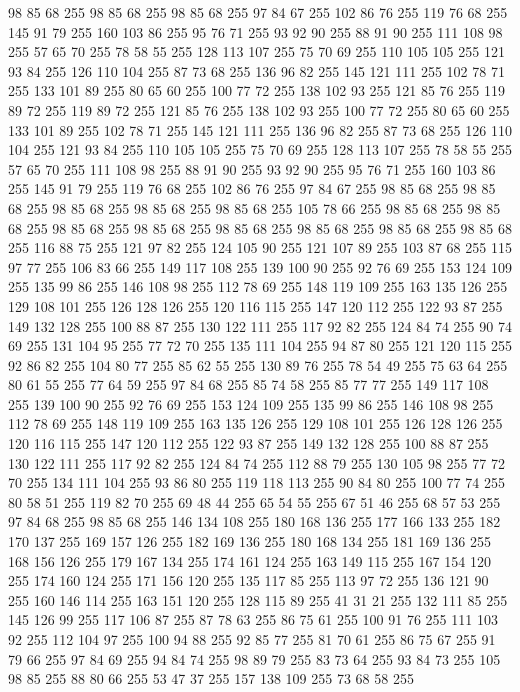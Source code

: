 98 85 68 255 98 85 68 255 98 85 68 255 97 84 67 255 102 86 76 255 119 76 68 255 145 91 79 255 160 103 86 255 95 76 71 255 93 92 90 255 88 91 90 255 111 108 98 255 57 65 70 255 78 58 55 255 128 113 107 255 75 70 69 255 110 105 105 255 121 93 84 255 126 110 104 255 87 73 68 255 136 96 82 255 145 121 111 255 102 78 71 255 133 101 89 255 80 65 60 255 100 77 72 255 138 102 93 255 121 85 76 255 119 89 72 255 119 89 72 255 121 85 76 255 138 102 93 255 100 77 72 255 80 65 60 255 133 101 89 255 102 78 71 255 145 121 111 255 136 96 82 255 87 73 68 255 126 110 104 255 121 93 84 255 110 105 105 255 75 70 69 255 128 113 107 255 78 58 55 255 57 65 70 255 111 108 98 255 88 91 90 255 93 92 90 255 95 76 71 255 160 103 86 255 145 91 79 255 119 76 68 255 102 86 76 255 97 84 67 255 98 85 68 255 98 85 68 255 98 85 68 255 98 85 68 255 98 85 68 255 105 78 66 255 98 85 68 255 98 85 68 255 98 85 68 255
98 85 68 255 98 85 68 255 98 85 68 255 98 85 68 255 98 85 68 255 116 88 75 255 121 97 82 255 124 105 90 255 121 107 89 255 103 87 68 255 115 97 77 255 106 83 66 255 149 117 108 255 139 100 90 255 92 76 69 255 153 124 109 255 135 99 86 255 146 108 98 255 112 78 69 255 148 119 109 255 163 135 126 255 129 108 101 255 126 128 126 255 120 116 115 255 147 120 112 255 122 93 87 255 149 132 128 255 100 88 87 255 130 122 111 255 117 92 82 255 124 84 74 255 90 74 69 255 131 104 95 255 77 72 70 255 135 111 104 255 94 87 80 255 121 120 115 255 92 86 82 255 104 80 77 255 85 62 55 255 130 89 76 255 78 54 49 255 75 63 64 255 80 61 55 255 77 64 59 255 97 84 68 255 85 74 58 255 85 77 77 255 149 117 108 255 139 100 90 255 92 76 69 255 153 124 109 255 135 99 86 255 146 108 98 255 112 78 69 255 148 119 109 255 163 135 126 255 129 108 101 255 126 128 126 255 120 116 115 255 147 120 112 255 122 93 87 255 149 132 128 255 100 88 87 255
130 122 111 255 117 92 82 255 124 84 74 255 112 88 79 255 130 105 98 255 77 72 70 255 134 111 104 255 93 86 80 255 119 118 113 255 90 84 80 255 100 77 74 255 80 58 51 255 119 82 70 255 69 48 44 255 65 54 55 255 67 51 46 255 68 57 53 255 97 84 68 255 98 85 68 255 146 134 108 255 180 168 136 255 177 166 133 255 182 170 137 255 169 157 126 255 182 169 136 255 180 168 134 255 181 169 136 255 168 156 126 255 179 167 134 255 174 161 124 255 163 149 115 255 167 154 120 255 174 160 124 255 171 156 120 255 135 117 85 255 113 97 72 255 136 121 90 255 160 146 114 255 163 151 120 255 128 115 89 255 41 31 21 255 132 111 85 255 145 126 99 255 117 106 87 255 87 78 63 255 86 75 61 255 100 91 76 255 111 103 92 255 112 104 97 255 100 94 88 255 92 85 77 255 81 70 61 255 86 75 67 255 91 79 66 255 97 84 69 255 94 84 74 255 98 89 79 255 83 73 64 255 93 84 73 255 105 98 85 255 88 80 66 255 53 47 37 255 157 138 109 255 73 68 58 255
